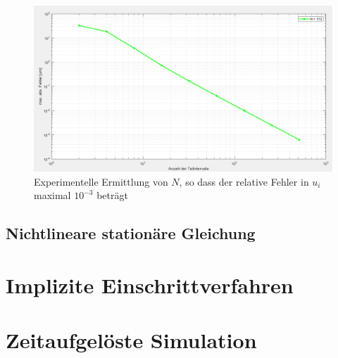 \documentclass[
	pagesize,
	fontsize=12pt,
	paper=a4,
	oneside,
   reqno
]{scrartcl}
\begin{document}
\begin{figure}[H]
   \centering
   \includegraphics[width=1\textwidth]{Bilder/Aufgabe_2_1_8_b.png}
   \caption[Experimentelle Ermittlung von $N$]{Experimentelle Ermittlung von $N$, so dass der relative Fehler in $u_i$ maximal $10^{-3}$ beträgt}
   \label{fig:Aufgabe_2_1_8_b}
\end{figure}

\subsection{Nichtlineare stationäre Gleichung}

\clearpage

\section{Implizite Einschrittverfahren} \label{sec:ImpliziteEinschrittverfahren}

\clearpage

\section{Zeitaufgelöste Simulation} \label{sec:ZeitaufgeloesteSimulation}

\clearpage

\newpage
\newcount\Quellennummer
{}

\renewcommand\refname{Literaturverzeichnis}
\end{document}
